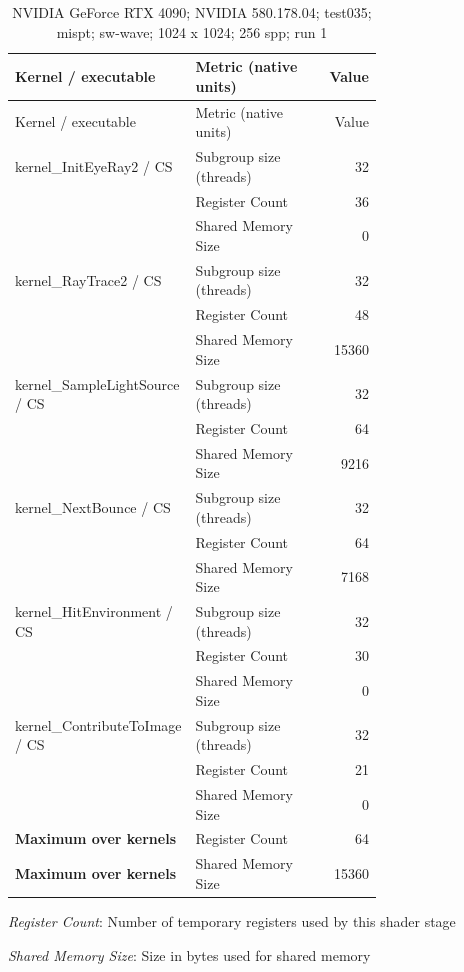 \begin{longtable}{p{0.30\linewidth}p{0.43\linewidth}r}
\caption{NVIDIA GeForce RTX 4090; NVIDIA 580.178.04; test035; mispt; sw-wave; 1024 x 1024; 256 spp; run 1}\label{tab:hydra-profile-14}\\
\hline Kernel / executable & Metric (native units) & Value \\\hline
\endfirsthead
\hline Kernel / executable & Metric (native units) & Value \\\hline
\endhead
kernel\_InitEyeRay2 / CS & Subgroup size (threads) & 32 \\
 & Register Count & 36 \\
 & Shared Memory Size & 0 \\
\hline
kernel\_RayTrace2 / CS & Subgroup size (threads) & 32 \\
 & Register Count & 48 \\
 & Shared Memory Size & 15360 \\
\hline
kernel\_SampleLightSource / CS & Subgroup size (threads) & 32 \\
 & Register Count & 64 \\
 & Shared Memory Size & 9216 \\
\hline
kernel\_NextBounce / CS & Subgroup size (threads) & 32 \\
 & Register Count & 64 \\
 & Shared Memory Size & 7168 \\
\hline
kernel\_HitEnvironment / CS & Subgroup size (threads) & 32 \\
 & Register Count & 30 \\
 & Shared Memory Size & 0 \\
\hline
kernel\_ContributeToImage / CS & Subgroup size (threads) & 32 \\
 & Register Count & 21 \\
 & Shared Memory Size & 0 \\
\hline
\textbf{Maximum over kernels} & Register Count & 64 \\
\textbf{Maximum over kernels} & Shared Memory Size & 15360 \\
\hline
\end{longtable}
\noindent\textit{Register Count}: Number of temporary registers used by this shader stage\par
\noindent\textit{Shared Memory Size}: Size in bytes used for shared memory\par
